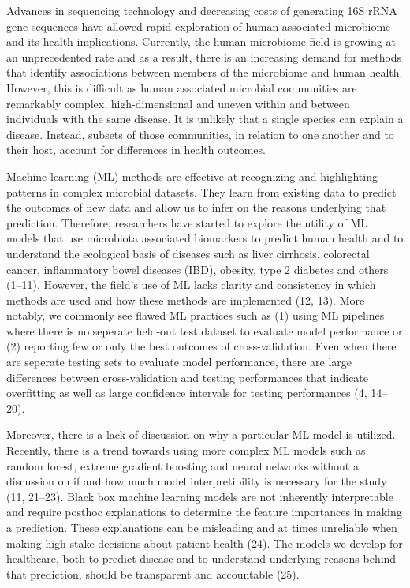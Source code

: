 \documentclass[11pt,]{article}
\begin{document}
Advances in sequencing technology and decreasing costs of generating 16S
rRNA gene sequences have allowed rapid exploration of human associated
microbiome and its health implications. Currently, the human microbiome
field is growing at an unprecedented rate and as a result, there is an
increasing demand for methods that identify associations between members
of the microbiome and human health. However, this is difficult as human
associated microbial communities are remarkably complex,
high-dimensional and uneven within and between individuals with the same
disease. It is unlikely that a single species can explain a disease.
Instead, subsets of those communities, in relation to one another and to
their host, account for differences in health outcomes.

Machine learning (ML) methods are effective at recognizing and
highlighting patterns in complex microbial datasets. They learn from
existing data to predict the outcomes of new data and allow us to infer
on the reasons underlying that prediction. Therefore, researchers have
started to explore the utility of ML models that use microbiota
associated biomarkers to predict human health and to understand the
ecological basis of diseases such as liver cirrhosis, colorectal cancer,
inflammatory bowel diseases (IBD), obesity, type 2 diabetes and others
(1--11). However, the field's use of ML lacks clarity and consistency in
which methods are used and how these methods are implemented (12, 13).
More notably, we commonly see flawed ML practices such as (1) using ML
pipelines where there is no seperate held-out test dataset to evaluate
model performance or (2) reporting few or only the best outcomes of
cross-validation. Even when there are seperate testing sets to evaluate
model performance, there are large differences between cross-validation
and testing performances that indicate overfitting as well as large
confidence intervals for testing performances (4, 14--20).

Moreover, there is a lack of discussion on why a particular ML model is
utilized. Recently, there is a trend towards using more complex ML
models such as random forest, extreme gradient boosting and neural
networks without a discussion on if and how much model interpretibility
is necessary for the study (11, 21--23). Black box machine learning
models are not inherently interpretable and require posthoc explanations
to determine the feature importances in making a prediction. These
explanations can be misleading and at times unreliable when making
high-stake decisions about patient health (24). The models we develop
for healthcare, both to predict disease and to understand underlying
reasons behind that prediction, should be transparent and accountable
(25).
\end{document}
